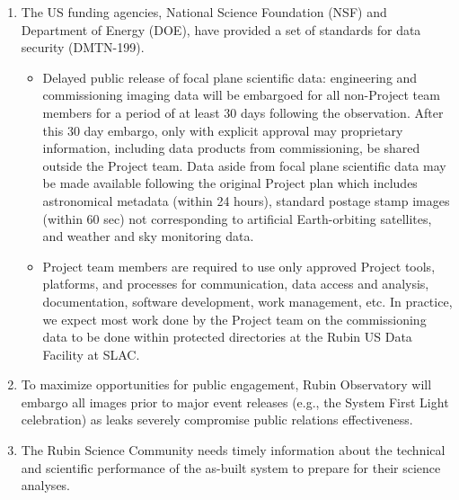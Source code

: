 \documentclass[SE,authoryear,toc,lsstdraft]{lsstdoc}
\begin{document}
\begin{enumerate}

  \item The US funding agencies, National Science Foundation (NSF) and Department of Energy (DOE), have provided a set of standards for data security (DMTN-199).

  \begin{itemize}

    \item Delayed public release of focal plane scientific data:
    engineering and commissioning imaging data will be embargoed for all non-Project team members for a period of at least 30 days following the observation.
    After this 30 day embargo, only with explicit approval may proprietary information, including data products from commissioning, be shared outside the Project team.
    Data aside from focal plane scientific data may be made available following the original Project plan which includes astronomical metadata (within 24 hours), standard postage stamp images (within 60 sec) not corresponding to artificial Earth-orbiting satellites, and weather and sky monitoring data.

    \item Project team members are required to use only approved Project tools, platforms, and processes for communication, data access and analysis, documentation, software development, work management, etc.
    In practice, we expect most work done by the Project team on the commissioning data to be done within protected directories at the Rubin US Data Facility at SLAC.

  \end{itemize}

  \item To maximize opportunities for public engagement, Rubin Observatory will embargo all images prior to major event releases (e.g., the System First Light celebration) as leaks severely compromise public relations effectiveness.

  \item The Rubin Science Community needs timely information about the technical and scientific performance of the as-built system to prepare for their science analyses.


\end{enumerate}
\end{document}
